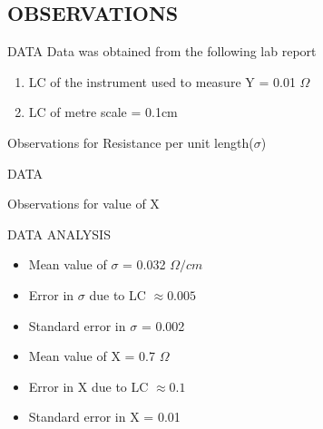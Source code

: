 \documentclass[aspectratio=169]{beamer}
\begin{document}
	\subsection{OBSERVATIONS}
	\begin{frame}{DATA}
		Data was obtained from the following lab report \cite{read}
		\begin{enumerate}
			\item LC of the instrument used to measure Y = 0.01 $\Omega$
			\item LC of metre scale = 0.1cm
		\end{enumerate}
		\begin{table}[h]
			\caption{Observations for Resistance per unit length($\sigma$)}
		\end{table}
	
	\end{frame}
	\begin{frame}{DATA}
		\begin{table}[h]
			\caption{Observations for value of X}
		\end{table}
	\end{frame}
	\begin{frame}{DATA ANALYSIS}
		\begin{itemize}
			\item Mean value of $\sigma$ = 0.032 $\Omega/cm$
			\item Error in $\sigma$ due to LC $\approx 0.005$ 
			\item Standard error in $\sigma$ = 0.002
			\item Mean value of X = 0.7 $\Omega$
			\item Error in X due to LC $\approx 0.1$ 
			\item Standard error in X = 0.01
		\end{itemize}
	\end{frame}
\end{document}
